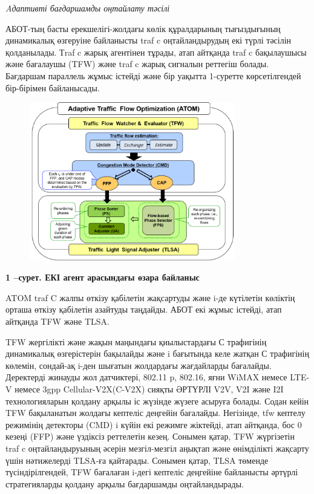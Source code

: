 \emph{Aдаптивті бағдаршамды оңтайлату тәсілі}

АБОТ-тың басты ерекшелігі-жолдағы көлік құралдарының тығыздығының
динамикалық өзгеруіне байланысты traf c оңтайландырудың екі түрлі
тәсілін қолданылады. Тraf c жарық агентінен тұрады, атап айтқанда traf c
бақылаушысы және бағалаушы (TFW) және traf c жарық сигналын реттегіш
болады. Бағдаршам параллель жұмыс істейді және бір уақытта 1-суретте
көрсетілгендей бір-бірімен байланысады.

\begin{figure}[H]
	\centering
	\includegraphics[width=0.8\textwidth]{assets/158}
	\caption*{}
\end{figure}

{\bfseries 1 --сурет. ЕКІ агент арасындағы өзара байланыс}

ATOM traf C жалпы өткізу қабілетін жақсартуды және i-де күтілетін
көліктің орташа өткізу қабілетін азайтуды таңдайды. АБОТ екі жұмыс
істейді, атап айтқанда TFW және TLSA.

TFW жергілікті және жақын маңындағы қиылыстардағы С трафигінің
динамикалық өзгерістерін бақылайды және i бағытында келе жатқан С
трафигінің көлемін, сондай-ақ i-ден шығатын жолдардағы жағдайларды
бағалайды. Деректерді жинауды жол датчиктері, 802.11 p, 802.16, яғни
WiMAX немесе LTE-V немесе 3gpp Cellular-V2X(C-V2X) сияқты ӘРТҮРЛІ V2V,
V2I және I2I технологияларын қолдану арқылы іс жүзінде жүзеге асыруға
болады. Содан кейін TFW бақыланатын жолдағы кептеліс деңгейін бағалайды.
Негізінде, tfw кептелу режимінің детекторы (CMD) i күйін екі режимге
жіктейді, атап айтқанда, бос 0 кезеңі (FFP) және үздіксіз реттелетін
кезең. Сонымен қатар, TFW жүргізетін traf c оңтайландыруының әсерін
мезгіл-мезгіл аңықтап және өнімділікті жақсарту үшін нәтижелерді TLSA-ға
қайтарады. Сонымен қатар, TLSA төменде түсіндірілгендей, TFW бағалаған
i-дегі кептеліс деңгейіне байланысты әртүрлі стратегияларды қолдану
арқылы бағдаршамды оңтайландырады.

